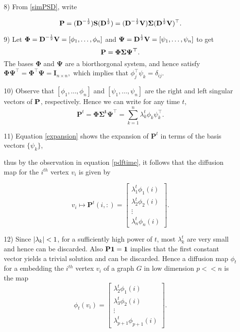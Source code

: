 \begin{itemize}
\item[8)] From \eqref{simPSD}, write 

\[\textbf{P} = (\textbf{D}^{-\frac{1}{2}}) \textbf{S} (\textbf{D}^{\frac{1}{2}} ) = 
 (\textbf{D}^{-\frac{1}{2}} \textbf{V}) \bm{\Sigma} (\textbf{D}^{\frac{1}{2}} \textbf{V} )^{\top}.
\] 
\item[9)] Let $\bm{\Phi} = \textbf{D}^{-\frac{1}{2}} \textbf{V}  = [\phi_{1}, \ldots, \phi_{n}]$ and 
$\bm{\Psi} = \textbf{D}^{\frac{1}{2}} \textbf{V} = [\psi_{1}, \ldots, \psi_{n}] $
to get  
\[\textbf{P} = \bm{\Phi \Sigma \Psi^{\top}}.
\]
The bases $\bm{\Phi}$ and $\bm{\Psi}$ are a biorthorgonal system, and hence satisfy
$ \bm{\Phi}\bm{\Psi}^{\top} =  \bm{\Phi}^{\top}\bm{\Psi}  = \bm{I}_{n \times n},$
which implies that $\phi_{j}^{\top}\psi_{k} = \delta_{ij}$.
\item[10)] Observe that  $[\phi_{1}, \ldots, \phi_{n}]$ and $[\psi_{1}, \ldots, \psi_{n}]$ are the right and left singular vectors of $\textbf{P}$, respectively.
Hence we can write for any time $t$,
\begin{equation}\label{expansion}
 \bm{P}^{t} = \bm{\Phi \Sigma^{t} \Psi^{\top}} = \displaystyle \sum_{k=1}^{n} \lambda_{k}^{t} \phi_{k} \psi_{k}^{\top}.
\end{equation} 

\item[11)] Equation \eqref{expansion} shows the expansion of $\bm{P}^{t}$ 
in terms of  the basis vectors $\{\psi_{k}\}$, 

thus by the observation in equation \eqref{pdftime}, it follows that the diffusion map for the $i^{th}$ vertex $v_{i}$ is given by

$$ v_{i} \mapsto \bm{P}^{t}(i,:) = \begin{bmatrix}
         \lambda_{1}^{t}\phi_{1}(i)\\
         \lambda_{2}^{t}\phi_{2}(i)\\
         \vdots\\
         \lambda_{n}^{t}\phi_{n}(i)
        \end{bmatrix} .$$
        
\item [12)] Since $\lvert\lambda_{k}\rvert < 1$, for a sufficiently high power of $t$,
most $\lambda_{k}^{t}$ are very small and hence can be discarded.
Also $\textbf{P}\boldsymbol{1} = \boldsymbol{1}$ implies that the first constant vector
yields a trivial solution and can be discarded.
Hence a diffusion map $\phi_{t}$ for a embedding the $i^{th}$ vertex $v_{i}$ of a graph $G$ in  low dimension $p << n$ is the map 
$$\phi_{t}(v_{i}) = \begin{bmatrix}
         \lambda_{2}^{t}\phi_{1}(i)\\
         \lambda_{3}^{t}\phi_{2}(i)\\
         \vdots\\
         \lambda_{p+1}^{t}\phi_{p+1}(i)
        \end{bmatrix} .$$
        
        

\end{itemize}
